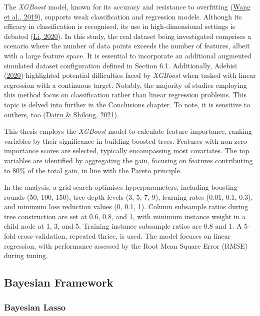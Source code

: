 \documentclass[
  11pt,
]{article}
\begin{document}
The \emph{XGBoost} model, known for its accuracy and resistance to
overfitting (\protect\hyperlink{ref-Wang2019}{Wang et al., 2019}),
supports weak classification and regression models. Although its
efficacy in classification is recognised, its use in high-dimensional
settings is debated (\protect\hyperlink{ref-Li2020}{Li, 2020}). In this
study, the real dataset being investigated comprises a scenario where
the number of data points exceeds the number of features, albeit with a
large feature space. It is essential to incorporate an additional
augmented simulated dataset configuration defined in Section 6.1.
Additionally, Adebisi (\protect\hyperlink{ref-Li2020}{2020}) highlighted
potential difficulties faced by \emph{XGBoost} when tasked with linear
regression with a continuous target. Notably, the majority of studies
employing this method focus on classification rather than linear
regression problems. This topic is delved into further in the
Conclusions chapter. To note, it is sensitive to outliers, too
(\protect\hyperlink{ref-Dairu2021}{Dairu \& Shilong, 2021}).

This thesis employs the \emph{XGBoost} model to calculate feature
importance, ranking variables by their significance in building boosted
trees. Features with non-zero importance scores are selected, typically
encompassing most covariates. The top variables are identified by
aggregating the gain, focusing on features contributing to 80\% of the
total gain, in line with the Pareto principle.

In the analysis, a grid search optimises hyperparameters, including
boosting rounds (50, 100, 150), tree depth levels (3, 5, 7, 9), learning
rates (0.01, 0.1, 0.3), and minimum loss reduction values (0, 0.1, 1).
Column subsample ratios during tree construction are set at 0.6, 0.8,
and 1, with minimum instance weight in a child node at 1, 3, and 5.
Training instance subsample ratios are 0.8 and 1. A 5-fold
cross-validation, repeated thrice, is used. The model focuses on linear
regression, with performance assessed by the Root Mean Square Error
(RMSE) during tuning.

\subsection{Bayesian Framework}

\subsubsection{Bayesian Lasso}
\end{document}
